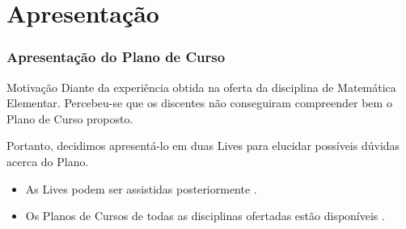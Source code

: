 \section{Apresentação}


\begin{frame}
    \frametitle{Apresentação do Plano de Curso}
    
    \begin{block}{Motivação}
        Diante da experiência obtida na oferta da disciplina de Matemática Elementar. Percebeu-se que os discentes não conseguiram compreender bem o Plano de Curso proposto.

        Portanto, decidimos apresentá-lo em duas Lives para elucidar possíveis dúvidas acerca do Plano.

        \pause

        \begin{itemize}
            \item As Lives podem ser assistidas posteriormente .
            \item Os Planos de Cursos de todas as disciplinas ofertadas estão disponíveis .
        \end{itemize} 
       
    \end{block}
\end{frame}

